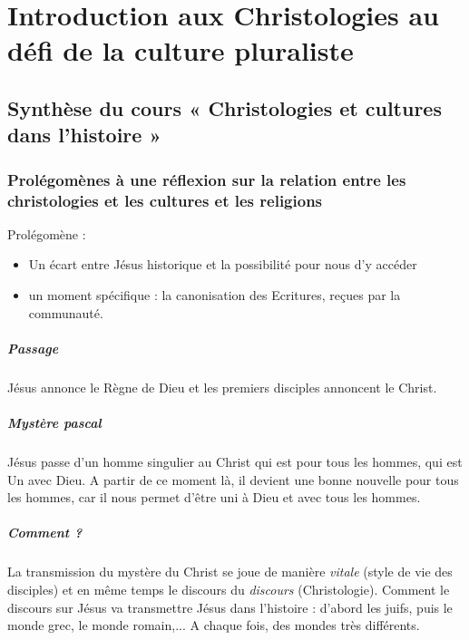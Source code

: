 \chapter{Introduction aux Christologies au défi de la culture pluraliste}
\section{Synthèse du cours « Christologies et cultures dans l’histoire »}
\subsection{Prolégomènes à une réflexion sur la relation entre les christologies et les cultures et
les religions}

 \begin{Synthesis}
 Prolégomène : 
 \begin{itemize}
     \item  Un écart entre Jésus historique et la possibilité pour nous d'y accéder 
     \item un moment spécifique : la canonisation des Ecritures, reçues par la communauté. 
 \end{itemize}

 \end{Synthesis}

 
\paragraph{Passage}
 Jésus annonce le Règne de Dieu et les premiers disciples annoncent le Christ.

 \paragraph{Mystère pascal} Jésus passe d'un homme singulier au Christ qui est pour tous les hommes, qui est Un avec Dieu. A partir de ce moment là, il devient une bonne nouvelle pour tous les hommes, car il nous permet d'être uni à Dieu et avec tous les hommes.


\paragraph{Comment ?} La transmission du mystère du Christ se joue de manière \textit{vitale} (style de vie des disciples) et en même temps le discours du \textit{discours} (Christologie). Comment le discours sur Jésus va transmettre Jésus dans l'histoire : d'abord les juifs, puis le monde grec, le monde romain,... A chaque fois, des mondes très différents.

